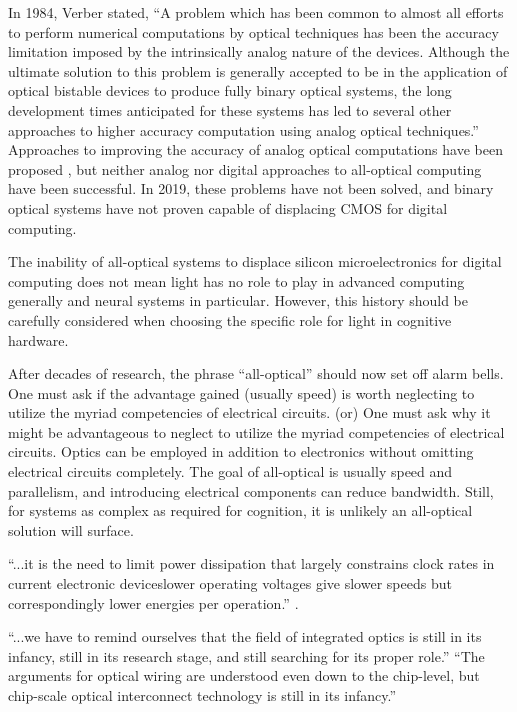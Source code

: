 \cite{ve1984} In 1984, Verber stated, ``A problem which has been common to almost all efforts to perform numerical computations by optical techniques has been the accuracy limitation imposed by the intrinsically analog nature of the devices. Although the ultimate solution to this problem is generally accepted to be in the application of optical bistable devices to produce fully binary optical systems, the long development times anticipated for these systems has led to several other approaches to higher accuracy computation using analog optical techniques.'' Approaches to improving the accuracy of analog optical computations have been proposed \cite{psca1980,arha1984}, but neither analog nor digital approaches to all-optical computing have been successful. In 2019, these problems have not been solved, and binary optical systems have not proven capable of displacing CMOS for digital computing. 

The inability of all-optical systems to displace silicon microelectronics for digital computing does not mean light has no role to play in advanced computing generally and neural systems in particular. However, this history should be carefully considered when choosing the specific role for light in cognitive hardware.

\vspace{3em}
After decades of research, the phrase ``all-optical'' should now set off alarm bells. One must ask if the advantage gained (usually speed) is worth neglecting to utilize the myriad competencies of electrical circuits. (or) One must ask why it might be advantageous to neglect to utilize the myriad competencies of electrical circuits. Optics can be employed in addition to electronics without omitting electrical circuits completely. The goal of all-optical is usually speed and parallelism, and introducing electrical components can reduce bandwidth. Still, for systems as complex as required for cognition, it is unlikely an all-optical solution will surface.



\vspace{3em}
``...it is the need to limit power dissipation that largely constrains clock rates in current electronic devices\textemdash lower operating voltages give slower speeds but correspondingly lower energies per operation.'' \cite{mi2010}.

\vspace{3em}
``...we have to remind ourselves that the field of integrated optics is still in its infancy, still in its research stage, and still searching for its proper role.'' \cite{ko1981}
``The arguments for optical wiring are understood even down to the chip-level, but chip-scale optical interconnect technology is still in its infancy.'' \cite{mi2010}

